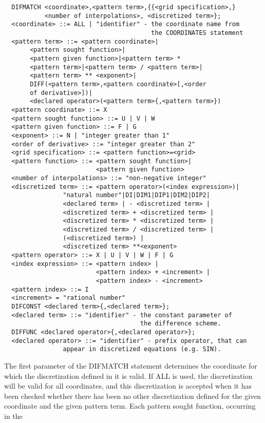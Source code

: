 \begin{verbatim}
  DIFMATCH <coordinate>,<pattern term>,{{<grid specification>,}
           <number of interpolations>, <discretized term>};
  <coordinate> ::= ALL | "identifier" - the coordinate name from
                                        the COORDINATES statement
  <pattern term> ::= <pattern coordinate>|
       <pattern sought function>|
       <pattern given function>|<pattern term> *
       <pattern term>|<pattern term> / <pattern term>|
       <pattern term> ** <exponent>|
       DIFF(<pattern term>,<pattern coordinate>[,<order
       of derivative>])|
       <declared operator>(<pattern term>{,<pattern term>})
  <pattern coordinate> ::= X
  <pattern sought function> ::= U | V | W
  <pattern given function> ::= F | G
  <exponent> ::= N | "integer greater than 1"
  <order of derivative> ::= "integer greater than 2"
  <grid specification> ::= <pattern function>=<grid>
  <pattern function> ::= <pattern sought function>|
                         <pattern given function>
  <number of interpolations> ::= "non-negative integer"
  <discretized term> ::= <pattern operator>(<index expression>)|
                "natural number"|DI|DIM1|DIP1|DIM2|DIP2|
                <declared term> | - <discretized term> |
                <discretized term> + <discretized term> |
                <discretized term> * <discretized term> |
                <discretized term> / <discretized term> |
                (<discretized term>) |
                <discretized term> **<exponent>
  <pattern operator> ::= X | U | V | W | F | G
  <index expression> ::= <pattern index> |
                         <pattern index> + <increment> |
                         <pattern index> - <increment>
  <pattern index> ::= I
  <increment> = "rational number"
  DIFCONST <declared term>{,<declared term>};
  <declared term> ::= "identifier" - the constant parameter of
                                     the difference scheme.
  DIFFUNC <declared operator>{,<declared operator>};
  <declared operator> ::= "identifier" - prefix operator, that can
                appear in discretized equations (e.g. SIN).
\end{verbatim}
The first parameter of the DIFMATCH statement determines  the coordinate
for which the discretization defined in it is valid. If ALL is used, the
discretization  will   be   valid   for   all   coordinates,   and  this
discretization is  accepted when  it has  been checked whether there has
been no other discretization  defined for  the given  coordinate and the
given  pattern  term.  Each  pattern  sought  function, occurring in the
